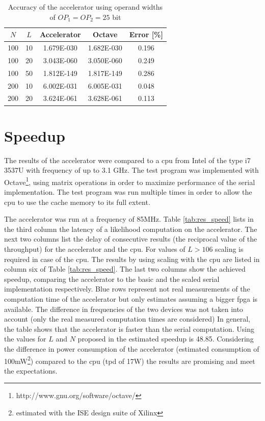\documentclass[mscthesis]{usiinfthesis}
\begin{document}
\begin{table}
    \footnotesize
    \begin{center}
    \begin{tabular}{|c|c|c|c|c|}
        \hline
        $N$ & $L$ & Accelerator & Octave & Error [\%] \\
        \hline
        \hline
        100 & 10 & 1.679E-030 & 1.682E-030 & 0.196 \\
        100 & 20 & 3.043E-060 & 3.050E-060 & 0.249 \\
        100 & 50 & 1.812E-149 & 1.817E-149 & 0.286 \\
        200 & 10 & 6.002E-031 & 6.005E-031 & 0.048 \\
        200 & 20 & 3.624E-061 & 3.628E-061 & 0.113 \\
        \hline
    \end{tabular}
    \end{center}
    \caption{Accuracy of the accelerator using operand widths of
        $OP_1 = OP_2 = 25$ bit}
    \label{tab:res_mid}
\end{table}

\section{Speedup}

The results of the accelerator were compared to a \gls{cpu} from Intel of the
type i7 3537U with frequency of up to 3.1 GHz. The test program was implemented
with Octave\footnote{http://www.gnu.org/software/octave/}, using matrix
operations in order to maximize performance of the serial implementation. The
test program was run multiple times in order to allow the \gls{cpu} to use the
cache memory to its full extent.

The accelerator was run at a frequency of 85MHz. Table \ref{tab:res_speed}
lists in the third column the latency of a likelihood computation on the
accelerator. The next two columns list the delay of consecutive results (the
reciprocal value of the throughput) for the accelerator and the \gls{cpu}. For
values of $L > 106$ scaling is required in case of the \gls{cpu}. The results
by using scaling with the \gls{cpu} are listed in column six of Table
\ref{tab:res_speed}.  The last two columns show the achieved speedup, comparing
the accelerator to the basic and the scaled serial implementation respectively.
Blue rows represent not real measurements of the computation time of the
accelerator but only estimates assuming a bigger \gls{fpga} is available. The
difference in frequencies of the two devices was not taken into account (only
the real measured computation times are considered) In general, the table shows
that the accelerator is faster than the serial computation. Using the values
for $L$ and $N$ proposed in \cite{salfner08} the estimated speedup is 48.85.
Considering the difference in power consumption of the accelerator (estimated
consumption of 100mW\footnote{estimated with the ISE design suite of Xilinx})
compared to the \gls{cpu} (\gls{tpd} of 17W) the results are promising and meet
the expectations.
\end{document}
